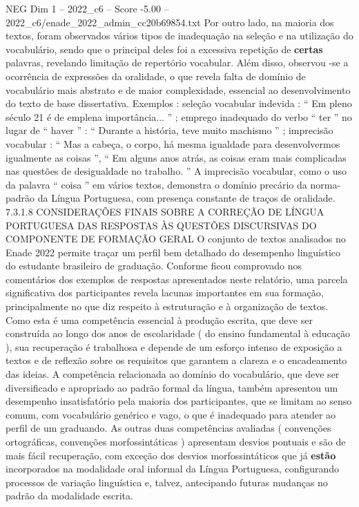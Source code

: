 \begin{textsample}{NEG Dim 1 – 2022\_c6 – Score -5.00 – 2022\_c6/enade\_2022\_admin\_cc20b69854.txt}
Por outro lado, na maioria dos textos, foram observados vários tipos de inadequação na seleção e na utilização do vocabulário, sendo que o principal deles foi a excessiva repetição de \textbf{certas} palavras, revelando limitação de repertório vocabular.
Além disso, observou -se a ocorrência de expressões da oralidade, o que revela falta de domínio de vocabulário mais abstrato e de maior complexidade, essencial ao desenvolvimento do texto de base dissertativa.
Exemplos : seleção vocabular indevida : “ Em pleno século 21 é de emplena importância... ” ; emprego inadequado do verbo “ ter ” no lugar de “ haver ” : “ Durante a história, teve muito machismo ” ; imprecisão vocabular : “ Mas a cabeça, o corpo, há mesma igualdade para desenvolvermos igualmente as coisas ”, “ Em alguns anos atrás, as coisas eram mais complicadas nas questões de desigualdade no trabalho. ” A imprecisão vocabular, como o uso da palavra “ coisa ” em vários textos, demonstra o domínio precário da norma-padrão da Língua Portuguesa, com presença constante de traços de oralidade. 7.3.1.8 CONSIDERAÇÕES FINAIS SOBRE A CORREÇÃO DE LÍNGUA PORTUGUESA DAS RESPOSTAS ÀS QUESTÕES DISCURSIVAS DO COMPONENTE DE FORMAÇÃO GERAL O conjunto de textos analisados no Enade 2022 permite traçar um perfil bem detalhado do desempenho linguístico do estudante brasileiro de graduação.
Conforme ficou comprovado nos comentários dos exemplos de respostas apresentados neste relatório, uma parcela significativa dos participantes revela lacunas importantes em sua formação, principalmente no que diz respeito à estruturação e à organização de textos.
Como esta é uma competência essencial à produção escrita, que deve ser construída ao longo dos anos de escolaridade ( do ensino fundamental à educação ), sua recuperação é trabalhosa e depende de um esforço intenso de exposição a textos e de reflexão sobre os requisitos que garantem a clareza e o encadeamento das ideias.
A competência relacionada ao domínio do vocabulário, que deve ser diversificado e apropriado ao padrão formal da língua, também apresentou um desempenho insatisfatório pela maioria dos participantes, que se limitam ao senso comum, com vocabulário genérico e vago, o que é inadequado para atender ao perfil de um graduando.
As outras duas competências avaliadas ( convenções ortográficas, convenções morfossintáticas ) apresentam desvios pontuais e são de mais fácil recuperação, com exceção dos desvios morfossintáticos que já \textbf{estão} incorporados na modalidade oral informal da Língua Portuguesa, configurando processos de variação linguística e, talvez, antecipando futuras mudanças no padrão da modalidade escrita.

\end{textsample}
